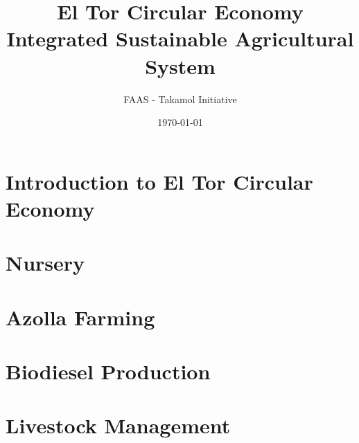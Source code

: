 \documentclass[12pt,a4paper,twoside]{report}
\title{El Tor Circular Economy\\
\large Integrated Sustainable Agricultural System}
\author{FAAS - Takamol Initiative}
\date{\today}
\begin{document}
\maketitle

\tableofcontents
\clearpage

\chapter{Introduction to El Tor Circular Economy}


\chapter{Nursery}









\chapter{Azolla Farming}









\chapter{Biodiesel Production}









\chapter{Livestock Management}








\end{document}
